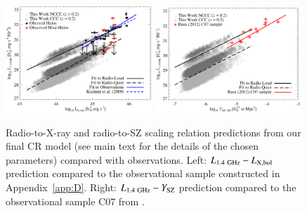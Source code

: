 \documentclass[traditabstract]{aa}
\newcommand{\rmn}{\mathrm}
\begin{document}
\begin{figure}[hbt!]
\centering
\includegraphics[width=0.49\textwidth]{figures/PL_relation.eps}
\includegraphics[width=0.49\textwidth]{figures/PSZ_relation.eps}
\caption{Radio-to-X-ray and radio-to-SZ scaling relation predictions from our final CR model (see main text for the details of the chosen parameters) compared with observations.
Left: $L_{1.4~\rmn{GHz}}-L_{\rm{X,bol}}$ prediction compared to the observational sample constructed in Appendix~\ref{app:D}. Right: $L_{1.4~\rmn{GHz}}-Y_{\rm{SZ}}$ prediction compared to the observational sample C07 from \cite{2012MNRAS.421L.112B}.}
\label{fig:PLSZ}
\end{figure}
 
\end{document}
